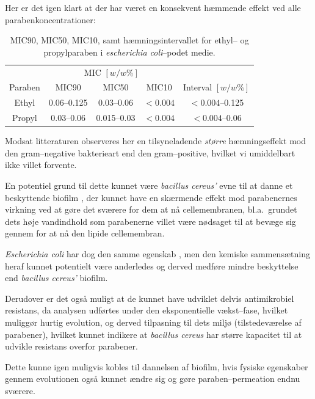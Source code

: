     Her er det igen klart at der har været en konsekvent hæmmende effekt ved alle parabenkoncentrationer:
    \begin{table}[H]\centering
        \caption{MIC90, MIC50, MIC10, samt hæmningsintervallet for ethyl-- og propylparaben i \textit{escherichia coli}--podet medie.}
        \begin{tabular}{ccccc}
            \toprule
            & \multicolumn{3}{c}{MIC $\left[\si{w\per w \%}\right]$} & \\
            \cmidrule(r){2-4}
            Paraben & MIC90 & MIC50 & MIC10 & Interval $\left[\si{w\per w \%}\right]$ \\
            \midrule
            Ethyl & 0.06--0.125 & 0.03--0.06 & $<0.004$ & $<0.004$--0.125 \\
            Propyl & 0.03--0.06 & 0.015--0.03 & $<0.004$ & $<0.004$--0.06 \\
            \bottomrule
        \end{tabular}
    \end{table}
    Modsat litteraturen observeres her en tilsyneladende \textit{større} hæmningseffekt mod den gram--negative bakterieart end den gram--positive, hvilket vi umiddelbart ikke villet forvente. 

    En potentiel grund til dette kunnet være \textit{bacillus cereus'} evne til at danne et beskyttende biofilm \parencite{Joaq2020,Mich2021}, der kunnet have en skærmende effekt mod parabenernes virkning ved at gøre det sværere for dem at nå cellemembranen, bl.a.\ grundet dets høje vandindhold \parencite{Sati2023} som parabenerne villet være nødsaget til at bevæge sig gennem for at nå den lipide cellemembran. 

    \textit{Escherichia coli} har dog den samme egenskab \parencite{Chri2010}, men den kemiske sammensætning heraf kunnet potentielt være anderledes og derved medføre mindre beskyttelse end \textit{bacillus cereus'} biofilm. 

    Derudover er det også muligt at de kunnet have udviklet delvis antimikrobiel resistans, da analysen udførtes under den eksponentielle vækst--fase, hvilket muliggør hurtig evolution, og derved tilpasning  til dets miljø (tilstedeværelse af parabener), hvilket kunnet indikere at \textit{bacillus cereus} har større kapacitet til at udvikle resistans overfor parabener.

    Dette kunne igen muligvis kobles til dannelsen af biofilm, hvis fysiske egenskaber gennem evolutionen også kunnet ændre sig og gøre paraben--permeation endnu sværere.
